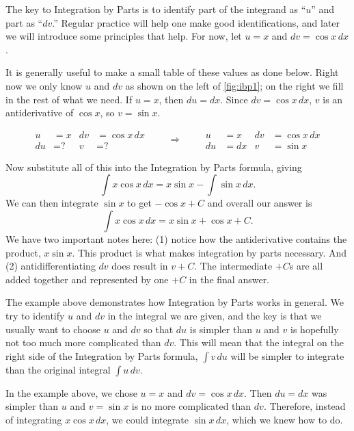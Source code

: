 {The key to Integration by Parts is to identify part of the integrand as ``$u$'' and part as ``$dv$.'' Regular practice will help one make good identifications, and later we will introduce some principles that help. For now, let  $u=x$ and $dv=\cos{x}\,dx$.

It is generally useful to make a small table of these values as done below. Right now we only know $u$ and $dv$ as shown on the left of \autoref{fig:ibp1}; on the right we fill in the rest of what we need. If $u = x$, then $du = dx$. Since $dv = \cos x\, dx$, $v$ is an antiderivative of $\cos x$, so $v = \sin x$.

\begin{lxfigure}
\[
\begin{aligned}
u&= x & dv&=\cos x\, dx\\
du&= \text{?} & v&=\text{?}
\end{aligned}
\qquad\Rightarrow\qquad
\begin{aligned}
u&= x & dv&=\cos x\, dx\\
du&= dx & v&=\sin x
\end{aligned}
\]
\label{fig:ibp1}
\end{lxfigure}

Now substitute all of this into the Integration by Parts formula, giving
$$\int x\cos x\,dx = x\sin x - \int \sin x \,dx.$$
We can then integrate $\sin x$ to get $-\cos x + C$ and overall our answer is
$$\int x\cos x\, dx = x\sin x + \cos x + C.$$
We have two important notes here: (1) notice how the antiderivative contains the product, $x\sin x$. This product is what makes integration by parts necessary. And (2) antidifferentiating $dv$ does result in $v+C$. The intermediate $+C$s are all added together and represented by one $+C$ in the final answer.}

The example above demonstrates how Integration by Parts works in general.  We try to identify $u$ and $dv$ in the integral we are given, and the key is that we usually want to choose $u$ and $dv$ so that $du$ is simpler than $u$ and $v$ is hopefully not too much more complicated than $dv$.  This will mean that the integral on the right side of the Integration by Parts formula, $\int v\,du$ will be simpler to integrate than the original integral $\int u\,dv$.

In the example above, we chose $u=x$ and $dv=\cos x\,dx$.  Then $du=dx$ was simpler than $u$ and $v=\sin x$ is no more complicated than $dv$.  Therefore, instead of integrating $x\cos x \,dx$, we could integrate $\sin x\,dx$, which we knew how to do.

